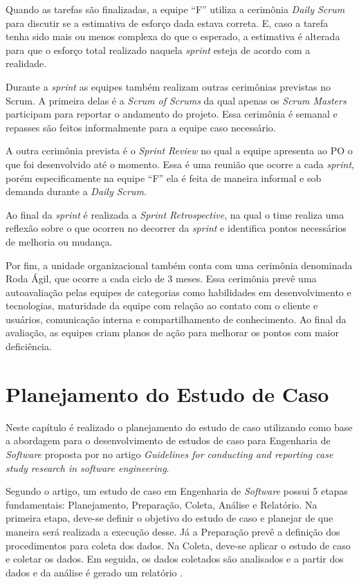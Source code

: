 \documentclass[
    12pt,       %
    openright,      %
    twoside,      %
    a4paper,      %
    english,      %
    french,       %
    spanish,      %
    brazil,       %
    ]{abntex2}
\begin{document}
Quando as tarefas são finalizadas, a equipe ``F'' utiliza a cerimônia \textit{Daily Scrum} para discutir se a estimativa de esforço dada estava correta. E, caso a tarefa tenha sido mais ou menos complexa do que o esperado, a estimativa é alterada para que o esforço total realizado naquela \textit{sprint} esteja de acordo com a realidade.

Durante a \textit{sprint} as equipes também realizam outras cerimônias previstas no Scrum. A primeira delas é a \textit{Scrum of Scrums} da qual apenas os \textit{Scrum Masters} participam para reportar o andamento do projeto. Essa cerimônia é semanal e repasses são feitos informalmente para a equipe caso necessário.

A outra cerimônia prevista é o \textit{Sprint Review} no qual a equipe apresenta ao PO o que foi desenvolvido até o momento. Essa é uma reunião que ocorre a cada \textit{sprint}, porém especificamente na equipe ``F'' ela é feita de maneira informal e sob demanda durante a \textit{Daily Scrum}.

Ao final da \textit{sprint} é realizada a \textit{Sprint Retrospective}, na qual o time realiza uma reflexão sobre o que ocorreu no decorrer da \textit{sprint} e identifica pontos necessários de melhoria ou mudança.

Por fim, a unidade organizacional também conta com uma cerimônia denominada Roda Ágil, que ocorre a cada ciclo de 3 meses. Essa cerimônia prevê uma autoavaliação pelas equipes de categorias como habilidades em desenvolvimento e tecnologias, maturidade da equipe com relação ao contato com o cliente e usuários, comunicação interna e compartilhamento de conhecimento. Ao final da avaliação, as equipes criam planos de ação para melhorar os pontos com maior deficiência. 

\chapter{Planejamento do Estudo de Caso}
\label{sec:Proposta}

Neste capítulo é realizado o planejamento do estudo de caso utilizando como base a abordagem para o desenvolvimento de estudos de caso para Engenharia de \textit{Software} proposta por  no artigo \textit{Guidelines for conducting and reporting case study research in software engineering}.

Segundo o artigo, um estudo de caso em Engenharia de \textit{Software} possui 5 etapas fundamentais: Planejamento, Preparação, Coleta, Análise e Relatório. Na primeira etapa, deve-se definir o objetivo do estudo de caso e planejar de que maneira será realizada a execução desse. Já a Preparação prevê a definição dos procedimentos para coleta dos dados. Na Coleta, deve-se aplicar o estudo de caso e coletar os dados. Em seguida, os dados coletados são analisados e a partir dos dados e da análise é gerado um relatório \cite{RUNESON:2009}.
\end{document}
